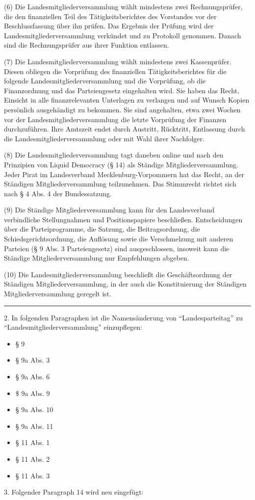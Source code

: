 (6) Die Landesmitgliederversammlung wählt mindestens zwei Rechnungsprüfer, die den finanziellen Teil des Tätigkeitsberichtes des Vorstandes vor der Beschlussfassung über ihn prüfen. Das Ergebnis der Prüfung wird der Landesmitgliederversammlung verkündet und zu Protokoll genommen. Danach sind die Rechnungsprüfer aus ihrer Funktion entlassen.

(7) Die Landesmitgliederversammlung wählt mindestens zwei Kassenprüfer. Diesen obliegen die Vorprüfung des finanziellen Tätigkeitsberichtes für die folgende Landesmitgliederversammlung und die Vorprüfung, ob die Finanzordnung und das Parteiengesetz eingehalten wird. Sie haben das Recht, Einsicht in alle finanzrelevanten Unterlagen zu verlangen und auf Wunsch Kopien persönlich ausgehändigt zu bekommen. Sie sind angehalten, etwa zwei Wochen vor der Landesmitgliederversammlung die letzte Vorprüfung der Finanzen durchzuführen. Ihre Amtszeit endet durch Austritt, Rücktritt, Entlassung durch die Landesmitgliederversammlung oder mit Wahl ihrer Nachfolger.

(8) Die Landesmitgliederversammlung tagt daneben online und nach den Prinzipien von Liquid Democracy (§ 14) als Ständige Mitgliederversammlung. Jeder Pirat im Landesverband Mecklenburg-Vorpommern hat das Recht, an der Ständigen Mitgliederversammlung teilzunehmen. Das Stimmrecht richtet sich nach § 4 Abs. 4 der Bundessatzung.

(9) Die Ständige Mitgliederversammlung kann für den Landesverband verbindliche Stellungnahmen und Positionspapiere beschließen. Entscheidungen über die Parteiprogramme, die Satzung, die Beitragsordnung, die Schiedsgerichtsordnung, die Auflösung sowie die Verschmelzung mit anderen Parteien (§ 9 Abs. 3 Parteiengesetz) sind ausgeschlossen, insoweit kann die Ständige Mitgliederversammlung nur Empfehlungen abgeben.

(10) Die Landesmitgliederversammlung beschließt die Geschäftsordnung der Ständigen Mitgliederversammlung, in der auch die Konstituierung der Ständigen Mitgliederversammlung geregelt ist.

\begin{center}\rule{3in}{0.4pt}\end{center}

2. In folgenden Paragraphen ist die Namensänderung von ``Landesparteitag'' zu ``Landesmitgliederversammlung'' einzupflegen:

\begin{itemize}
\item
  § 9
\item
  § 9a Abs. 3
\item
  § 9a Abs. 6
\item
  \$ 9a Abs. 9
\item
  § 9a Abs. 10
\item
  § 9a Abs. 11
\item
  § 11 Abs. 1
\item
  § 11 Abs. 2
\item
  § 11 Abs. 3
\end{itemize}
3. Folgender Paragraph 14 wird neu eingefügt:

